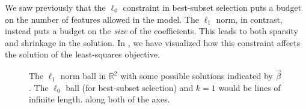 We saw previously that the \(\ell_0\) constraint in best-subset selection puts a budget on the number of features allowed in the model. The \(\ell_1\) norm, in contrast, instead puts a budget on the \emph{size} of the coefficients. This leads to both sparsity and shrinkage in the solution. In , we have visualized how this constraint affects the solution of the least-squares objective.

\begin{figure}
  \centering
  \hfill%
  \hfill%

  \caption{%
    The \(\ell_1\) norm ball in \(\mathbb{R}^2\) with some possible solutions indicated by \(\vec{\beta}\). The \(\ell_0\) ball (for best-subset selection) and \(k = 1\) would be lines of infinite length. along both of the axes.
  }
  \label{fig:lasso-ball}
\end{figure}

